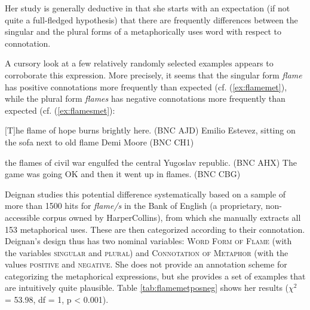 Her study is generally deductive in that she starts with an expectation (if not quite a full-fledged hypothesis) that there are frequently differences between the singular and the plural forms of a metaphorically uses word with respect to connotation.

A cursory look at a few relatively randomly selected examples appears to corroborate this expression. More precisely, it seems that the singular form \textit{flame} has positive connotations more frequently than expected (cf. (\ref{ex:flamemet}), while the plural form \textit{flames} has negative connotations more frequently than expected (cf. (\ref{ex:flamesmet}):

\begin{exe}
\ex
\begin{xlist} 
\label{ex:flamemet}
\ex $[$T$]$he flame of hope burns brightly here. (BNC AJD)
\ex Emilio Estevez, sitting on the sofa next to old flame Demi Moore (BNC CH1)
\end{xlist}
\end{exe}

\begin{exe}
\ex
\begin{xlist} 
\label{ex:flamesmet}
\ex the flames of civil war engulfed the central Yugoslav republic. (BNC AHX)
\ex The game was going OK and then it went up in flames. (BNC CBG)
\end{xlist}
\end{exe}

Deignan studies this potential difference systematically based on a sample of more than 1500 hits for \textit{flame/s} in the Bank of English (a proprietary, non-accessible corpus owned by HarperCollins), from which she manually extracts all 153 metaphorical uses. These are then categorized according to their connotation. Deignan's design thus has two nominal variables: \textsc{Word Form of Flame} (with the variables \textsc{singular} and \textsc{plural}) and \textsc{Connotation of Metaphor} (with the values \textsc{positive} and \textsc{negative}. She does not provide an annotation scheme for categorizing the metaphorical expressions, but she provides a set of examples that are intuitively quite plausible. Table \ref{tab:flamemetposneg} shows her results ($\chi^2$ = 53.98, df = 1, p < 0.001).

